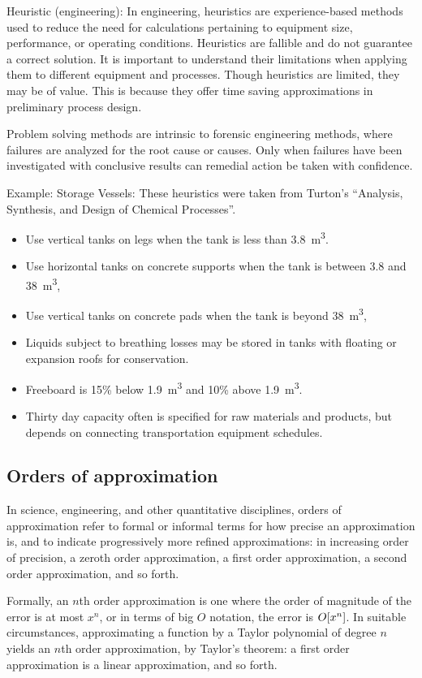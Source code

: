 Heuristic (engineering): In engineering, heuristics are experience-based methods used to reduce the need for calculations pertaining to equipment size, performance, or operating conditions. Heuristics are fallible and do not guarantee a correct solution. It is important to understand their limitations when applying them to different equipment and processes. Though heuristics are limited, they may be of value. This is because they offer time saving approximations in preliminary process design.

Problem solving methods are intrinsic to forensic engineering methods, where failures are analyzed for the root cause or causes. Only when failures have been investigated with conclusive results can remedial action be taken with confidence.

Example: Storage Vessels: These heuristics were taken from Turton's ``Analysis, Synthesis, and Design of Chemical Processes''.
\begin{itemize}
\item Use vertical tanks on legs when the tank is less than \SI{3.8}{m^3}.
\item Use horizontal tanks on concrete supports when the tank is between 3.8 and \SI{38}{m^3},
\item Use vertical tanks on concrete pads when the tank is beyond \SI{38}{m^3},
\item Liquids subject to breathing losses may be stored in tanks with floating or expansion roofs for conservation.
\item Freeboard is 15\% below \SI{1.9}{m^3} and 10\% above \SI{1.9}{m^3}.
\item Thirty day capacity often is specified for raw materials and products, but depends on connecting transportation equipment schedules.
\end{itemize}


\subsection{Orders of approximation}
In science, engineering, and other quantitative disciplines, orders of approximation refer to formal or informal terms for how precise an approximation is, and to indicate progressively more refined approximations: in increasing order of precision, a zeroth order approximation, a first order approximation, a second order approximation, and so forth.

Formally, an $n$th order approximation is one where the order of magnitude of the error is at most $x^n$, or in terms of big $O$ notation, the error is $O\!\left[{x^n}\right]$. In suitable circumstances, approximating a function by a Taylor polynomial of degree $n$ yields an $n$th order approximation, by Taylor's theorem: a first order approximation is a linear approximation, and so forth.


